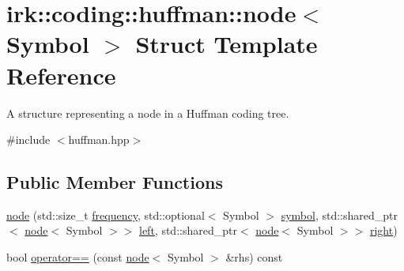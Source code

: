 \hypertarget{structirk_1_1coding_1_1huffman_1_1node}{}\section{irk\+:\+:coding\+:\+:huffman\+:\+:node$<$ Symbol $>$ Struct Template Reference}
\label{structirk_1_1coding_1_1huffman_1_1node}


A structure representing a node in a Huffman coding tree.  




{\ttfamily \#include $<$huffman.\+hpp$>$}

\subsection*{Public Member Functions}
\begin{DoxyCompactItemize}
\item 
\mbox{\hyperlink{structirk_1_1coding_1_1huffman_1_1node_ac43d799be382afcd794720a9c3294f4d}{node}} (std\+::size\+\_\+t \mbox{\hyperlink{structirk_1_1coding_1_1huffman_1_1node_ae303f67bca534f5fcbf2a64a586cd7a9}{frequency}}, std\+::optional$<$ Symbol $>$ \mbox{\hyperlink{porter2_8hpp_a04438e24473719aaf288c57833717164}{symbol}}, std\+::shared\+\_\+ptr$<$ \mbox{\hyperlink{structirk_1_1coding_1_1huffman_1_1node}{node}}$<$ Symbol $>$$>$ \mbox{\hyperlink{structirk_1_1coding_1_1huffman_1_1node_ac4303bd6570125c1d18506a8596f3b8f}{left}}, std\+::shared\+\_\+ptr$<$ \mbox{\hyperlink{structirk_1_1coding_1_1huffman_1_1node}{node}}$<$ Symbol $>$$>$ \mbox{\hyperlink{structirk_1_1coding_1_1huffman_1_1node_addc238c8601bb721a25a5750f6c33ebd}{right}})
\item 
bool \mbox{\hyperlink{structirk_1_1coding_1_1huffman_1_1node_a4e0666381a95883e54e9a952aefd3a31}{operator==}} (const \mbox{\hyperlink{structirk_1_1coding_1_1huffman_1_1node}{node}}$<$ Symbol $>$ \&rhs) const
\end{DoxyCompactItemize}
